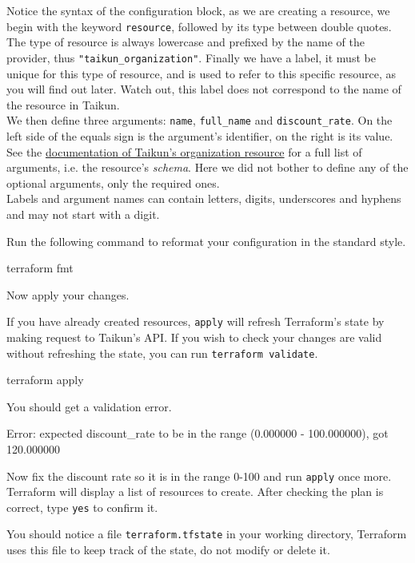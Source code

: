 \begin{info}
Notice the syntax of the configuration block, as we are creating a resource,
we begin with the keyword \texttt{resource}, followed by its type between double quotes.
The type of resource is always lowercase and prefixed by the name of the provider,
thus \texttt{"taikun\_organization"}.
Finally we have a label, it must be unique for this type of resource, and is used
to refer to this specific resource, as you will find out later.
Watch out, this label does not correspond to the name of the resource in Taikun.\\

We then define three arguments: \texttt{name}, \texttt{full\_name} and \texttt{discount\_rate}.
On the left side of the equals sign is the argument's identifier, on the right is its value.
See the \href{https://intuinewin.github.io/taikun-docs/resources/organization.html}{documentation of Taikun's organization resource} for a full list of arguments, i.e. the resource's \textit{schema}.
Here we did not bother to define any of the optional arguments, only the required ones.\\

Labels and argument names can contain letters, digits, underscores and hyphens and may not start with a digit.
\end{info}
Run the following command to reformat your configuration in the standard style.
\begin{shell}
terraform fmt
\end{shell}
Now apply your changes.
\begin{info}
If you have already created resources, \texttt{apply} will refresh Terraform's state
by making request to Taikun's API. If you wish to check your changes are valid
without refreshing the state, you can run \texttt{terraform validate}.
\end{info}
\begin{shell}
terraform apply
\end{shell}
You should get a validation error.
\begin{raw}
Error: expected discount_rate to be in the range (0.000000 - 100.000000), got 120.000000
\end{raw}
Now fix the discount rate so it is in the range 0-100 and run \texttt{apply} once more.
Terraform will display a list of resources to create.
After checking the plan is correct, type \texttt{yes} to confirm it.
\begin{info}
You should notice a file \texttt{terraform.tfstate} in your working directory,
Terraform uses this file to keep track of the state, do not modify or delete it.
\end{info}
